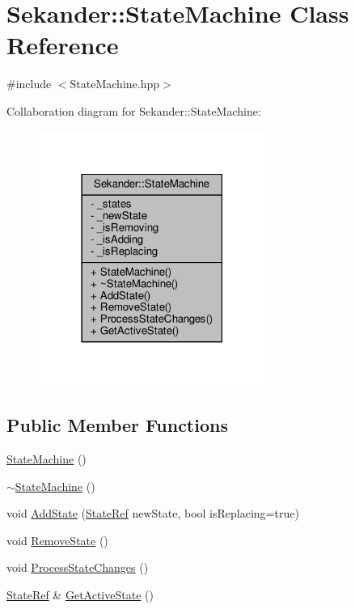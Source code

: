 \hypertarget{classSekander_1_1StateMachine}{}\section{Sekander\+:\+:State\+Machine Class Reference}
\label{classSekander_1_1StateMachine}


{\ttfamily \#include $<$State\+Machine.\+hpp$>$}



Collaboration diagram for Sekander\+:\+:State\+Machine\+:
\nopagebreak
\begin{figure}[H]
\begin{center}
\leavevmode
\includegraphics[width=210pt]{classSekander_1_1StateMachine__coll__graph}
\end{center}
\end{figure}
\subsection*{Public Member Functions}
\begin{DoxyCompactItemize}
\item 
\hyperlink{classSekander_1_1StateMachine_a6cfaf697fb22c18fb44c58577b63639d}{State\+Machine} ()
\item 
\hyperlink{classSekander_1_1StateMachine_a886e7903bb1c77ba62ec43cc07059a75}{$\sim$\+State\+Machine} ()
\item 
void \hyperlink{classSekander_1_1StateMachine_aae2cbc1386cfe4e71d91474536ba25c8}{Add\+State} (\hyperlink{namespaceSekander_a8503cedf9c863e9f6986eb29f2296f1a}{State\+Ref} new\+State, bool is\+Replacing=true)
\item 
void \hyperlink{classSekander_1_1StateMachine_a96961de2424fde705186da0ccd3bac70}{Remove\+State} ()
\item 
void \hyperlink{classSekander_1_1StateMachine_ad8b749d452acc69abd7c6a64c3e74983}{Process\+State\+Changes} ()
\item 
\hyperlink{namespaceSekander_a8503cedf9c863e9f6986eb29f2296f1a}{State\+Ref} \& \hyperlink{classSekander_1_1StateMachine_ae1501a43739f33ae0739532b0f2737b1}{Get\+Active\+State} ()
\end{DoxyCompactItemize}
